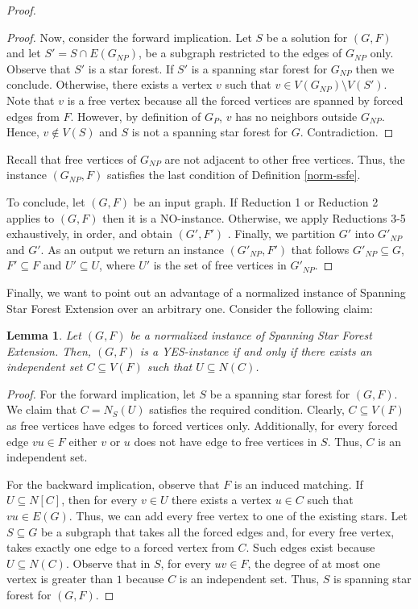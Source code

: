 \documentclass[en]{pracamgr}
\newtheorem{lemma}{Lemma}
\theoremstyle{definition}
\newcommand{\ssf}{spanning star forest}
\newcommand{\ssfep}{{\sc Spanning Star Forest Extension}}
\begin{document}
\begin{proof}
\begin{proof}
		Now, consider the forward implication. Let $S$ be a solution for $(G, F)$ and let $S' = S \cap E(G_{NP})$, be a subgraph restricted to the edges of $G_{NP}$ only. Observe that $S'$ is a star forest. If $S'$ is a spanning star forest for $G_{NP}$ then we conclude. Otherwise, there exists a vertex $v$ such that $v \in V(G_{NP}) \setminus V(S')$. Note that $v$ is a free vertex because all the forced vertices are spanned by forced edges from $F$. However, by definition of $G_P$, $v$ has no neighbors outside $G_{NP}$. Hence, $v \notin V(S)$ and $S$ is not a spanning star forest for $G$. Contradiction.
	\end{proof}

	Recall that free vertices of $G_{NP}$ are not adjacent to other free vertices. Thus, the instance $(G_{NP},F)$ satisfies the last condition of Definition \ref{norm-ssfe}.

	To conclude, let $(G,F)$ be an input graph. If Reduction 1 or Reduction 2 applies to $(G,F)$ then it is a NO-instance. Otherwise, we apply Reductions 3-5 exhaustively, in order, and obtain $(G',F')$ . Finally, we partition $G'$ into $G'_{NP}$ and $G'$. As an output we return an instance $(G'_{NP},F')$ that follows $G'_{NP} \subseteq G$, $F' \subseteq F$ and $U' \subseteq U$, where $U'$ is the set of free vertices in $G'_{NP}$. \qedhere

\end{proof}

Finally, we want to point out an advantage of a normalized instance of \ssfep{} over an arbitrary one. Consider the following claim:

\begin{lemma}\label{span-lemma}
	Let $(G,F)$ be a normalized instance of \ssfep{}. Then, $(G,F)$ is a YES-instance if and only if there exists an independent set $C \subseteq V(F)$ such that $U \subseteq N(C)$.
\end{lemma}

\begin{proof}
	For the forward implication, let $S$ be a \ssf{} for $(G,F)$. We claim that $C = N_S(U)$ satisfies the required condition. Clearly, $C \subseteq V(F)$ as free vertices have edges to forced vertices only. Additionally, for every forced edge $vu \in F$ either $v$ or $u$ does not have edge to free vertices in $S$. Thus, $C$ is an independent set. 
	
	For the backward implication, observe that $F$ is an induced matching. If $U \subseteq N[C]$, then for every $v \in U$ there exists a vertex $u \in C$ such that $vu \in E(G)$. Thus, we can add every free vertex to one of the existing stars. Let $S \subseteq G$ be a subgraph that takes all the forced edges and, for every free vertex, takes exactly one edge to a forced vertex from $C$. Such edges exist because $U \subseteq N(C)$. Observe that in $S$, for every $uv \in F$, the degree of at most one vertex is greater than $1$ because $C$ is an independent set. Thus, $S$ is spanning star forest for $(G,F)$.
\end{proof}
\end{document}

